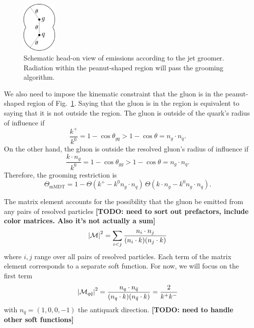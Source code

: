 \documentclass[11pt,twoside,reqno]{amsart}
\theoremstyle{plain}
\theoremstyle{remark}
\theoremstyle{definition}
\theoremstyle{remark}
\theoremstyle{definition}
\theoremstyle{definition}
\newcommand{\cM}{\mathcal{M}}
\newcommand{\mMDT}{\mathrm{mMDT}}
\begin{document}
	\begin{figure}\label{fig:schematic}
		\includegraphics[width=0.15\textwidth]{figures/head_on_schematic.pdf}
		\caption{Schematic head-on view of emissions according to the jet groomer. Radiation within the peanut-shaped region will pass the grooming algorithm.}
	\end{figure}

	We also need to impose the kinematic constraint that the gluon is in the peanut-shaped region of Fig.~\ref{fig:schematic}. Saying that the gluon is in the region is equivalent to saying that it is not outside the region. The gluon is outside of the quark's radius of influence if
	\begin{equation}
		\frac{k^+}{k^0} = 1 - \cos\theta_{gq} > 1 - \cos\theta = n_g \cdot n_q.
	\end{equation}
	On the other hand, the gluon is outside the resolved gluon's radius of influence if
	\begin{equation}
		\frac{k \cdot n_g}{k^0} = 1 - \cos\theta_{gg} > 1 - \cos\theta = n_g \cdot n_q.
	\end{equation}
	Therefore, the grooming restriction is
	\begin{equation}
		\Theta_{\mMDT} = 1 - \Theta(k^+ - k^0 n_g \cdot n_q)\,\Theta(k \cdot n_g - k^0 n_g \cdot n_q).
	\end{equation}

	The matrix element accounts for the possibility that the gluon be emitted from any pairs of resolved particles {\color{red}\textbf{[TODO: need to sort out prefactors, include color matrices. Also it's not actually a sum]}}
	\begin{equation}
		\abs{\cM}^2 = \sum_{i < j} \frac{n_i \cdot n_j}{(n_i \cdot k)(n_j \cdot k)}
	\end{equation}
	where $i, j$ range over all pairs of resolved particles. Each term of the matrix element corresponds to a separate soft function. For now, we will focus on the first term
	\begin{equation}
		\abs{\cM_{q\bar q}}^2 = \frac{n_q \cdot n_{\bar q}}{(n_q \cdot k)(n_{\bar q}\cdot k)} = \frac{2}{k^+ k^-}
	\end{equation}
	with $n_{\bar q} = (1, 0, 0, -1)$ the antiquark direction. {\color{red}\textbf{[TODO: need to handle other soft functions]}}
\end{document}
